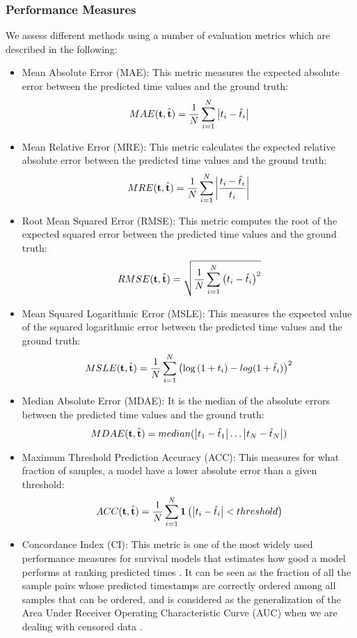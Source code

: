 \subsubsection{Performance Measures}
We assess different methods using a number of evaluation metrics which are described in the following:
\begin{itemize}
\item Mean Absolute Error (MAE): This metric measures the expected absolute error between the predicted time values and the ground truth:
\[MAE(\mathbf{t},\hat{\mathbf{t}}) = \frac{1}{N}\sum_{i=1}^{N}\left|t_i-\hat{t}_i\right|\]
\item Mean Relative Error (MRE): This metric calculates the expected relative absolute error between the predicted time values and the ground truth:
\[MRE(\mathbf{t},\hat{\mathbf{t}}) = \frac{1}{N}\sum_{i=1}^{N}\left|\frac{t_i-\hat{t}_i}{t_i}\right|\]
\item Root Mean Squared Error (RMSE): This metric computes the root of the expected squared error between the predicted time values and the ground truth:
\[RMSE(\mathbf{t},\hat{\mathbf{t}}) = \sqrt{\frac{1}{N}\sum_{i=1}^{N}\left(t_i-\hat{t}_i\right)^2}\]
\item Mean Squared Logarithmic Error (MSLE): This measures the expected value of the squared logarithmic error between the predicted time values and the ground truth:
\[MSLE(\mathbf{t},\hat{\mathbf{t}}) = \frac{1}{N}\sum_{i=1}^{N}\left(\log{(1+t_i)}-log{(1+\hat{t}_i)}\right)^2\]
\item Median Absolute Error (MDAE): It is the median of the absolute errors between the predicted time values and the ground truth:
\[MDAE(\mathbf{t},\hat{\mathbf{t}}) = median(\left|t_1-\hat{t}_1\right|\dots\left|t_N-\hat{t}_N\right|)\]
\item Maximum Threshold Prediction Accuracy (ACC): This measures for what fraction of samples, a model have a lower absolute error than a given threshold:
\[ACC(\mathbf{t},\hat{\mathbf{t}})=\frac{1}{N}\sum_{i=1}^{N}\mathbf{1}\left(\left|t_i-\hat{t}_i\right| < threshold\right)\]
\item Concordance Index (CI): This metric is one of the most widely used performance measures for survival models that estimates how good a model performs at ranking predicted times \cite{harrell1982evaluating}. It can be seen as the fraction of all the sample pairs whose predicted timestamps are correctly ordered among all samples that can be ordered, and is considered as the generalization of the Area Under Receiver Operating Characteristic Curve (AUC) when we are dealing with censored data \cite{steck2008ranking}.
\end{itemize}

